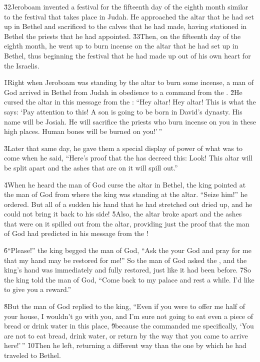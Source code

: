 \v{32}Jeroboam invented a festival for the fifteenth day of the eighth month similar to the festival that takes place in Judah. He approached the altar that he had set up in Bethel and sacrificed to the calves that he had made, having stationed in Bethel the priests that he had appointed. \v{33}Then, on the fifteenth day of the eighth month, he went up to burn incense on the altar that he had set up in Bethel, thus beginning the festival that he had made up out of his own heart for the Israelis.

\v{1}Right when Jeroboam was standing by the altar to burn some incense, a man of God arrived in Bethel from Judah in obedience to a command from the . \v{2}He cursed the altar in this message from the : ``Hey altar! Hey altar! This is what the  says: `Pay attention to this! A son is going to be born in David's dynasty. His name will be Josiah. He will sacrifice the priests who burn incense on you in these high places. Human bones will be burned on you!'\,''

\v{3}Later that same day, he gave them a special display of power of what was to come when he said, ``Here's proof that the  has decreed this: Look! This altar will be split apart and the ashes that are on it will spill out.''

\v{4}When he heard the man of God curse the altar in Bethel, the king pointed at the man of God from where the king was standing at the altar. ``Seize him!'' he ordered. But all of a sudden his hand that he had stretched out dried up, and he could not bring it back to his side! \v{5}Also, the altar broke apart and the ashes that were on it spilled out from the altar, providing just the proof that the man of God had predicted in his message from the !

\v{6}``Please!'' the king begged the man of God, ``Ask the  your God and pray for me that my hand may be restored for me!'' So the man of God asked the , and the king's hand was immediately and fully restored, just like it had been before. \v{7}So the king told the man of God, ``Come back to my palace and rest a while. I'd like to give you a reward.''

\v{8}But the man of God replied to the king, ``Even if you were to offer me half of your house, I wouldn't go with you, and I'm sure not going to eat even a piece of bread or drink water in this place, \v{9}because the  commanded me specifically, `You are not to eat bread, drink water, or return by the way that you came to arrive here!'\,'' \v{10}Then he left, returning a different way than the one by which he had traveled to Bethel.

